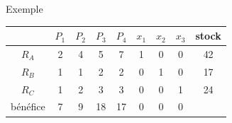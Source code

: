 \documentclass{beamer}
\begin{document}
  \begin{frame}
    \begin{exampleblock}{Exemple}
      \begin{center}
        \begin{tabular}{|c|ccccccc|c|}\hline
          & $P_1$ & $P_2$ & $P_3$ & $P_4$ & $x_1$ & $x_2$ & $x_3$ & stock \\ \hline
          $R_A$ & 2 & 4 & 5 & 7 & 1 & 0 & 0 & 42 \\
          $R_B$ & 1 & 1 & 2 & 2 & 0 & 1 & 0 & 17 \\
          $R_C$ & 1 & 2 & 3 & 3 & 0 & 0 & 1 & 24 \\ \hline
          bénéfice & 7 & 9 & \color{red}18\color{black} & 17 & 0 & 0 & 0 & \\ \hline
        \end{tabular}
      \end{center}
    \end{exampleblock}
  \end{frame}
\end{document}
